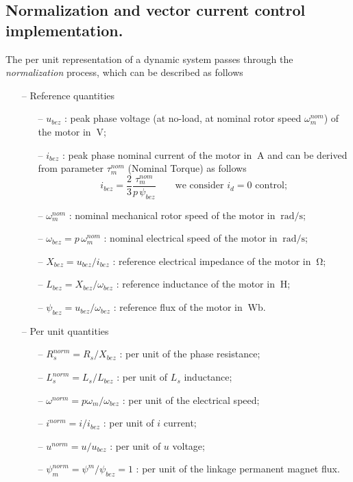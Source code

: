 \documentclass[11pt,a4paper,oneside]{book}
\numberwithin{equation}{section}
\theoremstyle{it}
\theoremstyle{definition}
\begin{document}
\subsection{Normalization and vector current control implementation.}
The per unit representation of a dynamic system passes through the \textit{normalization} process, which can be described as follows
\begin{itemize}
	\item[--] Reference quantities
	\begin{itemize}
		\item[--] $u_{bez}$ : peak phase voltage (at no-load, at nominal rotor speed $\omega_m^{nom}$) of the motor in $\SI{}{\volt}$;
		\item[--] $i_{bez}$ : peak phase nominal current of the motor in $\SI{}{\ampere}$ and can be derived from parameter $\tau_m^{nom}$ (Nominal Torque) as follows
		\begin{equation}
			i_{bez} = \frac{2}{3}\frac{\tau_m^{nom}}{p\,\psi_{bez}} \qquad\text{we consider $i_d=0$ control};
		\end{equation}
		\item[--] $\omega_m^{nom}$ : nominal mechanical rotor speed of the motor in $\SI{}{\radian\per\second}$;
		\item[--] $\omega_{bez} = p\,\omega_m^{nom}$ : nominal electrical speed of the motor in $\SI{}{\radian\per\second}$;
		\item[--] $X_{bez} = u_{bez}/i_{bez}$ : reference electrical impedance of the motor in $\SI{}{\ohm}$;
		\item[--] $L_{bez} = X_{bez}/\omega_{bez}$ : reference inductance of the motor in $\SI{}{\henry}$;
		\item[--] $\psi_{bez} = u_{bez}/\omega_{bez}$ : reference flux of the motor in $\SI{}{\weber}$.
	\end{itemize}
	\item[--] Per unit quantities
	\begin{itemize}
		\item[--] $R_s^{norm} = R_s/X_{bez}$ : per unit of the phase resistance;
		\item[--] $L_s^{norm} = L_s/L_{bez}$ : per unit of $L_s$ inductance;
		\item[--] $\omega^{norm} = p\omega_m/\omega_{bez}$ : per unit of the electrical speed;		
		\item[--] $i^{norm} = i/i_{bez}$ : per unit of $i$ current;
		\item[--] $u^{norm} = u/u_{bez}$ : per unit of $u$ voltage;
		\item[--] $\psi_m^{norm} = \psi^m/\psi_{bez} = 1$ : per unit of the linkage permanent magnet flux.
	\end{itemize}	 
\end{itemize}
\end{document}
